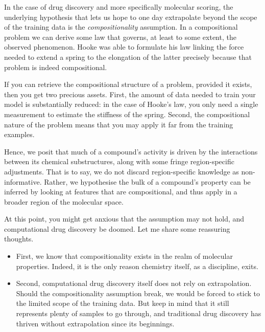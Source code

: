 \documentclass[11pt]{article}
\numberwithin{equation}{subsection}
\begin{document}
In the case of drug discovery and more specifically molecular scoring, the underlying hypothesis that lets us hope to one day extrapolate beyond the scope of the training data is the \textit{compositionality} assumption. In a compositional problem we can derive some law that governs, at least to some extent, the observed phenomenon. Hooke was able to formulate his law linking the force needed to extend a spring to the elongation of the latter precisely because that problem is indeed compositional.


If you can retrieve the compositional structure of a problem, provided it exists, then you get two precious assets. First, the amount of data needed to train your model is substantially reduced: in the case of Hooke's law, you only need a single measurement to estimate the stiffness of the spring. Second, the compositional nature of the problem means that you may apply it far from the training examples.

Hence, we posit that much of a compound's activity is driven by the interactions between its chemical substructures, along with some fringe region-specific adjustments. That is to say, we do not discard region-specific knowledge as non-informative. Rather, we hypothesise the bulk of a compound's property can be inferred by looking at features that are compositional, and thus apply in a broader region of the molecular space.

At this point, you might get anxious that the assumption may not hold, and computational drug discovery be doomed. Let me share some reassuring thoughts.
\begin{itemize}
  \item First, we know that compositionality exists in the realm of molecular properties. Indeed, it is the only reason chemistry itself, as a discipline, exits.

  \item Second, computational drug discovery itself does not rely on extrapolation. Should the compositionality assumption break, we would be forced to stick to the limited scope of the training data. But keep in mind that it still represents plenty of samples to go through, and traditional drug discovery has thriven without extrapolation since its beginnings.
\end{itemize}
\end{document}
